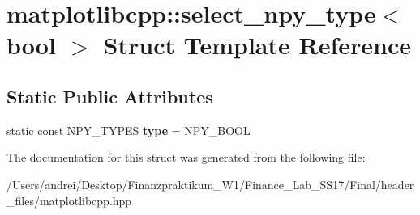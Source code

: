 \hypertarget{structmatplotlibcpp_1_1select__npy__type_3_01bool_01_4}{}\section{matplotlibcpp\+:\+:select\+\_\+npy\+\_\+type$<$ bool $>$ Struct Template Reference}
\label{structmatplotlibcpp_1_1select__npy__type_3_01bool_01_4}
\subsection*{Static Public Attributes}
\begin{DoxyCompactItemize}
\item 
\mbox{\label{structmatplotlibcpp_1_1select__npy__type_3_01bool_01_4_a79dc3db61a3b0f4796a29d067d5dd374}} 
static const N\+P\+Y\+\_\+\+T\+Y\+P\+ES {\bfseries type} = N\+P\+Y\+\_\+\+B\+O\+OL
\end{DoxyCompactItemize}


The documentation for this struct was generated from the following file\+:\begin{DoxyCompactItemize}
\item 
/\+Users/andrei/\+Desktop/\+Finanzpraktikum\+\_\+\+W1/\+Finance\+\_\+\+Lab\+\_\+\+S\+S17/\+Final/header\+\_\+files/matplotlibcpp.\+hpp\end{DoxyCompactItemize}
